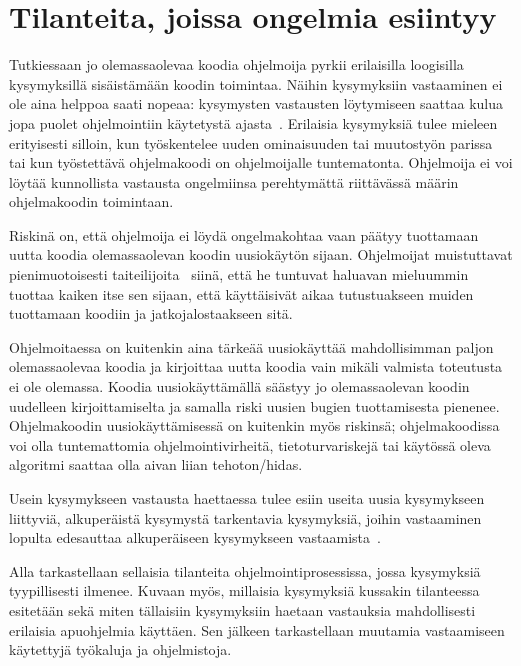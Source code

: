 \documentclass[finnish]{tktltiki2}
\theoremstyle{definition}
\theoremstyle{remark}
\begin{document}
\section{Tilanteita, joissa ongelmia esiintyy}

Tutkiessaan jo olemassaolevaa koodia ohjelmoija pyrkii erilaisilla loogisilla kysymyksillä sisäistämään koodin toimintaa. Näihin kysymyksiin vastaaminen ei ole aina helppoa saati nopeaa: kysymysten vastausten löytymiseen saattaa kulua jopa puolet ohjelmointiin käytetystä ajasta~\cite{eliciting-design-requirements-for-maintenance-oriented-ides}. Erilaisia kysymyksiä tulee mieleen erityisesti silloin, kun työskentelee uuden ominaisuuden tai muutostyön parissa tai kun työstettävä ohjelmakoodi on ohjelmoijalle tuntematonta. Ohjelmoija ei voi löytää kunnollista vastausta ongelmiinsa perehtymättä riittävässä määrin ohjelmakoodin toimintaan.

Riskinä on, että ohjelmoija ei löydä ongelmakohtaa vaan päätyy tuottamaan uutta koodia olemassaolevan koodin uusiokäytön sijaan. Ohjelmoijat muistuttavat pienimuotoisesti taiteilijoita~\cite{hackers-and-painters} siinä, että he tuntuvat haluavan mieluummin tuottaa kaiken itse sen sijaan, että käyttäisivät aikaa tutustuakseen muiden tuottamaan koodiin ja jatkojalostaakseen sitä.

Ohjelmoitaessa on kuitenkin aina tärkeää uusiokäyttää mahdollisimman paljon olemassaolevaa koodia ja kirjoittaa uutta koodia vain mikäli valmista toteutusta ei ole olemassa. Koodia uusiokäyttämällä säästyy jo olemassaolevan koodin uudelleen kirjoittamiselta ja samalla riski uusien bugien tuottamisesta pienenee. Ohjelmakoodin uusiokäyttämisessä on kuitenkin myös riskinsä; ohjelmakoodissa voi olla tuntemattomia ohjelmointivirheitä, tietoturvariskejä tai käytössä oleva algoritmi saattaa olla aivan liian tehoton/hidas.

Usein kysymykseen vastausta haettaessa tulee esiin useita uusia kysymykseen liittyviä, alkuperäistä kysymystä tarkentavia kysymyksiä, joihin vastaaminen lopulta edesauttaa alkuperäiseen kysymykseen vastaamista~\cite{questions-during-software-evolution-tasks}.

Alla tarkastellaan sellaisia tilanteita ohjelmointiprosessissa, jossa kysymyksiä tyypillisesti ilmenee. Kuvaan myös, millaisia kysymyksiä kussakin tilanteessa esitetään sekä miten tällaisiin kysymyksiin haetaan vastauksia mahdollisesti erilaisia apuohjelmia käyttäen. Sen jälkeen tarkastellaan muutamia vastaamiseen käytettyjä työkaluja ja ohjelmistoja.
\end{document}
